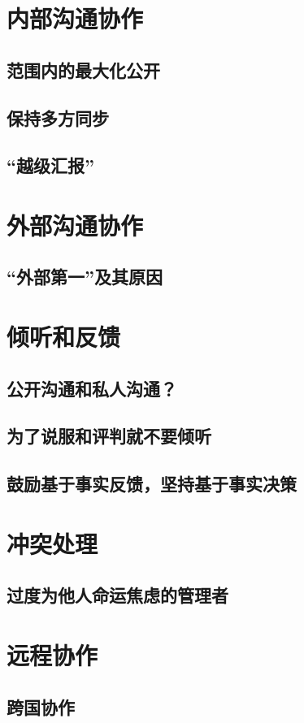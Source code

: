 
\section{内部沟通协作}
\subsection{范围内的最大化公开}
\subsection{保持多方同步}

\subsection{“越级汇报”}

\section{外部沟通协作}
\subsection{“外部第一”及其原因}

\section{倾听和反馈}
\subsection{公开沟通和私人沟通？}
\subsection{为了说服和评判就不要倾听}
\subsection{鼓励基于事实反馈，坚持基于事实决策}

\section{冲突处理}
\subsection{过度为他人命运焦虑的管理者}

\section{远程协作}
\subsection{跨国协作}